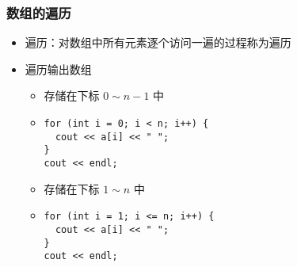 \begin{frame}[fragile]
    \frametitle{数组的遍历}

    \begin{overlayarea}{\textwidth}{.66\textheight}
        \begin{itemize}
            \item 遍历：对数组中所有元素逐个访问一遍的过程称为遍历

            \item 遍历输出数组

                \begin{itemize}
                    \item<1-> 存储在下标 $0 \sim n - 1$ 中
                    \item<1-> \lstinline|for (int i = 0; i < n; i++) {|\\
                        \lstinline|  cout << a[i] << " ";|\\
                        \lstinline|}|\\
                        \lstinline|cout << endl;|\\
                    \item<2-> 存储在下标 $1 \sim n$ 中
                    \item<2-> \lstinline|for (int i = 1; i <= n; i++) {|\\
                        \lstinline|  cout << a[i] << " ";|\\
                        \lstinline|}|\\
                        \lstinline|cout << endl;|\\
                \end{itemize}

        \end{itemize}
    \end{overlayarea}
\end{frame}

